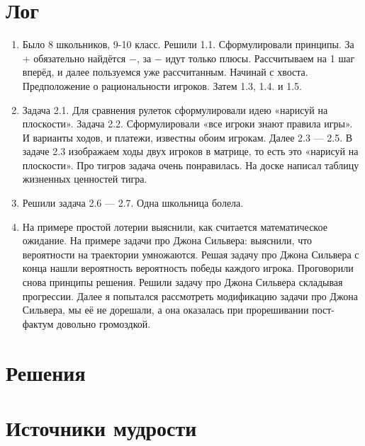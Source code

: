 \documentclass[12pt]{article}
\newcounter{problem}[section]
\begin{document}
\section{Лог}

\begin{enumerate}
  \item Было 8 школьников, 9-10 класс. Решили 1.1. Сформулировали принципы.
  За $+$ обязательно найдётся $-$, за $-$ идут только плюсы.
  Рассчитываем на 1 шаг вперёд, и далее пользуемся уже рассчитанным.
  Начинай с хвоста. Предположение о рациональности игроков.  Затем 1.3, 1.4. и 1.5.
  \item Задача 2.1. Для сравнения рулеток сформулировали идею «нарисуй на плоскости».
  Задача 2.2. Сформулировали «все игроки знают правила игры». И варианты
  ходов, и платежи, известны обоим игрокам. Далее 2.3 — 2.5.
  В задаче 2.3 изображаем ходы двух игроков в матрице, то есть это
  «нарисуй на плоскости». Про тигров задача очень понравилась. На доске написал
  таблицу жизненных ценностей тигра.
  \item Решили задача 2.6 — 2.7. Одна школьница болела.
  \item На примере простой лотерии выяснили, как считается математическое
  ожидание. На примере задачи про Джона Сильвера: выяснили, что вероятности на
  траектории умножаются. Решая задачу про Джона Сильвера с конца нашли вероятность
  вероятность победы каждого игрока. Проговорили снова принципы решения.
  Решили задачу про Джона Сильвера складывая прогрессии. Далее я попытался
  рассмотреть модификацию задачи про Джона Сильвера, мы её не дорешали,
  а она оказалась при прорешивании пост-фактум довольно громоздкой.

\end{enumerate}




\renewenvironment{solution}[1]{%
         \vskip .5cm plus 2cm minus 0.1cm%
         {\bfseries \hyperlink{problem:#1}{#1.}}%
}%
{%
}%

\section{Решения}


\section{Источники мудрости}
\printbibliography[heading=none]
\end{document}

